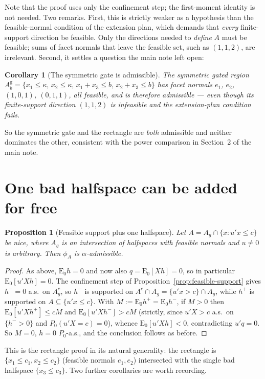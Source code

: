 \documentclass[12pt]{article}
\newtheorem{proposition}{Proposition}
\newtheorem{corollary}{Corollary}
\theoremstyle{remark}
\newcommand{\E}{\mathrm{E}}
\begin{document}
Note that the proof uses only the confinement step; the first-moment
identity is not needed. Two remarks. First, this is strictly weaker as a
hypothesis than the feasible-normal condition of the extension plan, which
demands that \emph{every} finite-support direction be feasible. Only the
directions needed to \emph{define} $A$ must be feasible; sums of facet
normals that leave the feasible set, such as $(1,1,2)$, are irrelevant.
Second, it settles a question the main note left open:

\begin{corollary}[The symmetric gate is admissible]
The symmetric gated region
$A_b^{\mathrm g}=\{x_1\le\kappa,\,x_2\le\kappa,\,x_1+x_3\le b,\,
x_2+x_3\le b\}$ has facet normals $e_1$, $e_2$, $(1,0,1)$, $(0,1,1)$, all
feasible, and is therefore admissible --- even though its finite-support
direction $(1,1,2)$ is infeasible and the extension-plan condition fails.
\end{corollary}

So the symmetric gate and the rectangle are \emph{both} admissible and
neither dominates the other, consistent with the power comparison in
Section~2 of the main note.

\section{One bad halfspace can be added for free}

\begin{proposition}[Feasible support plus one halfspace]
\label{prop:one-bad-facet}
Let $A=A_g\cap\{x:u'x\le c\}$ be nice, where $A_g$ is an intersection of
halfspaces with feasible normals and $u\ne0$ is arbitrary. Then $\phi_A$ is
$\alpha$-admissible.
\end{proposition}

\begin{proof}
As above, $\E_0h=0$ and now also $q=\E_0[Xh]=0$, so in particular
$\E_0[u'Xh]=0$. The confinement step of
Proposition~\ref{prop:feasible-support} gives $h^-=0$ a.s.\ on $A_g^c$, so
$h^-$ is supported on $A^c\cap A_g=\{u'x>c\}\cap A_g$, while $h^+$ is
supported on $A\subseteq\{u'x\le c\}$. With $M:=\E_0h^+=\E_0h^-$, if $M>0$
then $\E_0[u'Xh^+]\le cM$ and $\E_0[u'Xh^-]>cM$ (strictly, since $u'X>c$
a.s.\ on $\{h^->0\}$ and $P_0(u'X=c)=0$), whence $\E_0[u'Xh]<0$,
contradicting $u'q=0$. So $M=0$, $h=0$ $P_0$-a.s., and the conclusion
follows as before.
\end{proof}

This is the rectangle proof in its natural generality: the rectangle is
$\{x_1\le c_1,x_2\le c_2\}$ (feasible normals $e_1,e_2$) intersected with
the single bad halfspace $\{x_3\le c_3\}$. Two further corollaries are worth
recording.
\end{document}
